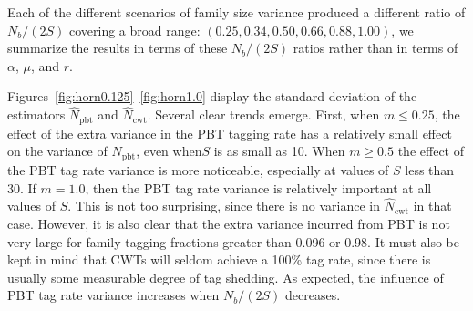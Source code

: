 \documentclass[11pt]{article}
\begin{document}
Each of the different scenarios of family size variance produced a different ratio of $N_b/(2S)$ covering a broad range:
$(0.25, 0.34, 0.50, 0.66, 0.88, 1.00)$, we summarize the results in terms of these $N_b/(2S)$ ratios
rather than in terms of $\alpha$, $\mu$, and $r$.





Figures~\ref{fig:horn0.125}--\ref{fig:horn1.0} display the standard deviation of the estimators
$\hat{N}_\mathrm{pbt}$ and $\hat{N}_\mathrm{cwt}$.  Several clear trends emerge.  First, when 
$m\leq 0.25$, the effect of the extra  variance in the PBT tagging rate has a relatively small
effect on the variance of $\hat{N}_\mathrm{pbt}$, even when$S$ is as small as 10.  When $m\geq 0.5$
the effect of the PBT tag rate variance is more noticeable, especially at values of $S$ less than
30.  If $m=1.0$, then the PBT tag rate variance is relatively important at all values of
$S$.  This is not too surprising, since there is no variance in $\hat{N}_\mathrm{cwt}$ in that
case.  However, it is also clear that the extra variance incurred from PBT is not very large
for family tagging fractions greater than 0.096 or 0.98.  It must also be kept in mind that
CWTs will seldom achieve a 100\% tag rate, since there is usually some measurable degree of
tag shedding.   As expected, the influence of PBT tag rate variance increases when $N_b/(2S)$
decreases.
\end{document}
